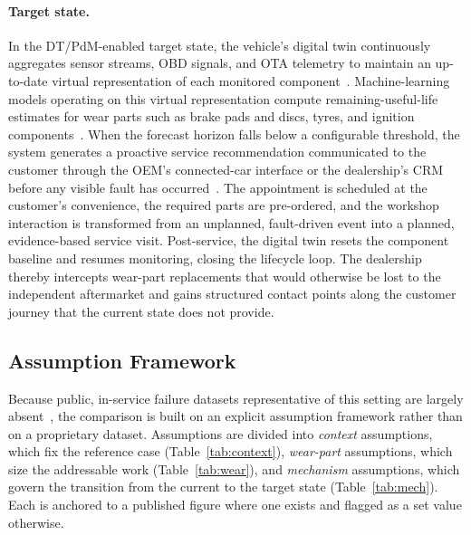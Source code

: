 \documentclass[conference,a4paper]{IEEEtran}
\begin{document}
\paragraph{Target state.}
In the DT/PdM-enabled target state, the vehicle's digital twin continuously
aggregates sensor streams, OBD signals, and OTA telemetry to maintain an
up-to-date virtual representation of each monitored
component~\cite{lopes2025vehicledt}. Machine-learning models operating on this
virtual representation compute remaining-useful-life estimates for wear parts
such as brake pads and discs, tyres, and ignition
components~\cite{kumar2025suspension,karthick2025simulating}. When the forecast
horizon falls below a configurable threshold, the system generates a proactive
service recommendation communicated to the customer through the OEM's
connected-car interface or the dealership's CRM before any visible fault has
occurred~\cite{challagalla_proactive_2009,gonzalez-pridaDigitalTransformationAftersales2025}.
The appointment is scheduled at the customer's convenience, the required parts
are pre-ordered, and the workshop interaction is transformed from an unplanned,
fault-driven event into a planned, evidence-based service visit. Post-service,
the digital twin resets the component baseline and resumes monitoring, closing
the lifecycle loop. The dealership thereby intercepts wear-part replacements
that would otherwise be lost to the independent aftermarket and gains structured
contact points along the customer journey that the current state does not provide.

\subsection{Assumption Framework}

Because public, in-service failure datasets representative of this setting are
largely absent~\cite{abougrad2026xai}, the comparison is built on an explicit assumption
framework rather than on a proprietary dataset. Assumptions are divided into
\emph{context} assumptions, which fix the reference case (Table~\ref{tab:context}),
\emph{wear-part} assumptions, which size the addressable work
(Table~\ref{tab:wear}), and \emph{mechanism} assumptions, which govern the
transition from the current to the target state (Table~\ref{tab:mech}). Each is
anchored to a published figure where one exists and flagged as a set value otherwise.
 
\end{document}
